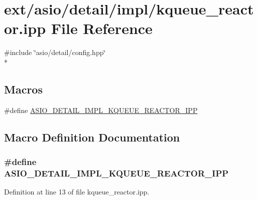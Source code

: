\hypertarget{kqueue__reactor_8ipp}{}\section{ext/asio/detail/impl/kqueue\+\_\+reactor.ipp File Reference}
\label{kqueue__reactor_8ipp}
{\ttfamily \#include \char`\"{}asio/detail/config.\+hpp\char`\"{}}\\*
\subsection*{Macros}
\begin{DoxyCompactItemize}
\item 
\#define \hyperlink{kqueue__reactor_8ipp_adf458b45a9b388ed55d98b59f4243414}{A\+S\+I\+O\+\_\+\+D\+E\+T\+A\+I\+L\+\_\+\+I\+M\+P\+L\+\_\+\+K\+Q\+U\+E\+U\+E\+\_\+\+R\+E\+A\+C\+T\+O\+R\+\_\+\+I\+P\+P}
\end{DoxyCompactItemize}


\subsection{Macro Definition Documentation}
\hypertarget{kqueue__reactor_8ipp_adf458b45a9b388ed55d98b59f4243414}{}
\subsubsection[{A\+S\+I\+O\+\_\+\+D\+E\+T\+A\+I\+L\+\_\+\+I\+M\+P\+L\+\_\+\+K\+Q\+U\+E\+U\+E\+\_\+\+R\+E\+A\+C\+T\+O\+R\+\_\+\+I\+P\+P}]{\setlength{\rightskip}{0pt plus 5cm}\#define A\+S\+I\+O\+\_\+\+D\+E\+T\+A\+I\+L\+\_\+\+I\+M\+P\+L\+\_\+\+K\+Q\+U\+E\+U\+E\+\_\+\+R\+E\+A\+C\+T\+O\+R\+\_\+\+I\+P\+P}\label{kqueue__reactor_8ipp_adf458b45a9b388ed55d98b59f4243414}


Definition at line 13 of file kqueue\+\_\+reactor.\+ipp.

